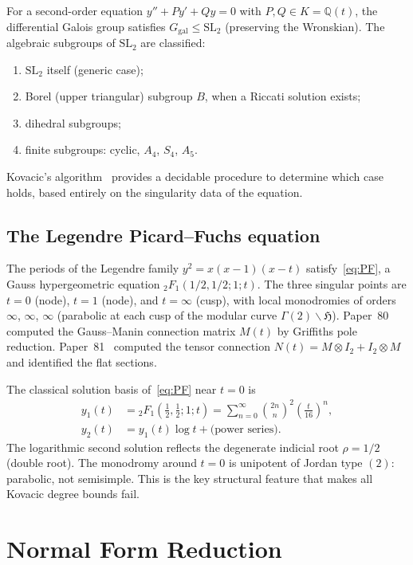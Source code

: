 \documentclass[11pt]{article}
\theoremstyle{plain}
\theoremstyle{definition}
\theoremstyle{remark}
\newcommand{\Q}{\mathbb{Q}}
\newcommand{\SL}{\mathrm{SL}}
\newcommand{\Ggal}{G_{\mathrm{gal}}}
\begin{document}
For a second-order equation $y'' + Py' + Qy = 0$ with $P, Q \in K = \Q(t)$, the differential Galois group satisfies $\Ggal \leq \SL_2$ (preserving the Wronskian).
The algebraic subgroups of $\SL_2$ are classified:
\begin{enumerate}[label=(\alph*)]
  \item $\SL_2$ itself (generic case);
  \item Borel (upper triangular) subgroup $B$, when a Riccati solution exists;
  \item dihedral subgroups;
  \item finite subgroups: cyclic, $A_4$, $S_4$, $A_5$.
\end{enumerate}
Kovacic's algorithm~\cite{Kovacic1986} provides a decidable procedure to determine which case holds, based entirely on the singularity data of the equation.

\subsection{The Legendre Picard--Fuchs equation}

The periods of the Legendre family $y^2 = x(x-1)(x-t)$ satisfy~\eqref{eq:PF}, a Gauss hypergeometric equation ${}_2F_1(1/2, 1/2; 1; t)$.
The three singular points are $t = 0$ (node), $t = 1$ (node), and $t = \infty$ (cusp), with local monodromies of orders $\infty$, $\infty$, $\infty$ (parabolic at each cusp of the modular curve $\Gamma(2) \backslash \mathfrak{H}$).
Paper~80~\cite{Lee2026P80} computed the Gauss--Manin connection matrix $M(t)$ by Griffiths pole reduction.
Paper~81~\cite{Lee2026P81} computed the tensor connection $N(t) = M \otimes I_2 + I_2 \otimes M$ and identified the flat sections.

The classical solution basis of~\eqref{eq:PF} near $t = 0$ is
\begin{align*}
  y_1(t) &= {}_2F_1(\tfrac{1}{2}, \tfrac{1}{2}; 1; t) = \sum_{n=0}^{\infty} \binom{2n}{n}^2 \left(\frac{t}{16}\right)^n, \\
  y_2(t) &= y_1(t) \log t + \text{(power series)}.
\end{align*}
The logarithmic second solution reflects the degenerate indicial root $\rho = 1/2$ (double root).
The monodromy around $t = 0$ is unipotent of Jordan type $(2)$: parabolic, not semisimple.
This is the key structural feature that makes all Kovacic degree bounds fail.

\section{Normal Form Reduction}
\label{sec:normalform}
\end{document}

